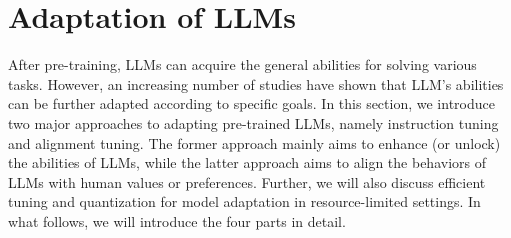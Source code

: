 \section{Adaptation of LLMs}
\label{sec-adaptation}

After pre-training, LLMs can acquire the general abilities for  solving various tasks. However, an increasing number of studies have shown  that LLM's abilities can be further adapted according to specific goals.
In this section, we introduce two major approaches to adapting pre-trained LLMs, namely instruction tuning and alignment tuning. The former approach  mainly aims to enhance (or unlock) the abilities of LLMs, while the latter approach aims to align the behaviors of LLMs with human values or preferences. 
Further, we will also discuss  efficient tuning and quantization for  model adaptation in resource-limited settings.  
In what follows, we will introduce the four parts in detail. 







